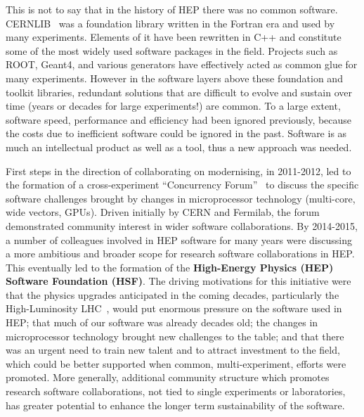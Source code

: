 \documentclass{article}
\begin{document}
This is not to say that in the history of HEP there was no common software. 
CERNLIB~\cite{CERNLIB} was a foundation library written in the Fortran era and used by many experiments.  Elements of it have been rewritten in C++ and constitute some of the most widely used software packages in the field.  Projects such as ROOT, Geant4, and various generators have effectively acted as common glue for many experiments.  However in the software layers above these foundation and toolkit libraries, redundant
solutions that are difficult to evolve and sustain over time
(years or decades for large experiments!) are common. 
To a large extent, software speed, performance and efficiency had been ignored previously, because the costs due to inefficient software could be ignored in the past. Software is as much an intellectual product as well as a tool, thus a new approach was needed.

First steps in the direction of collaborating on modernising, in 2011-2012, led to the formation of a
cross-experiment ``Concurrency Forum''~\cite{CERN-RD-MULTICORE} to discuss
the specific software challenges brought by changes in microprocessor
technology (multi-core, wide vectors, GPUs). Driven initially by CERN
and Fermilab, the forum demonstrated community interest in wider
software collaborations. By 2014-2015, a number of colleagues involved
in HEP software for many years were discussing a more ambitious and
broader scope for research software collaborations in HEP. This
eventually led to the formation of the \textbf{High-Energy Physics (HEP)
Software Foundation (HSF)}. The driving motivations for this initiative
were that the physics upgrades anticipated in the coming decades,
particularly the High-Luminosity LHC~\cite{HL-LHC}, would put enormous
pressure on the software used in HEP; that much of our software was
already decades old; the changes in microprocessor technology brought
new challenges to the table; and that there was an urgent need to train
new talent and to attract investment to the field, which could be better
supported when common, multi-experiment, efforts were promoted. More
generally, additional community structure which promotes research
software collaborations, not tied to single experiments or laboratories,
has greater potential to enhance the longer term sustainability of the
software.
\end{document}
